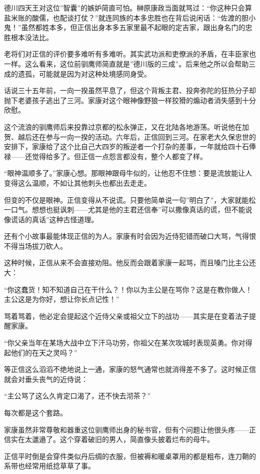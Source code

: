 \documentclass[
]{article}
\begin{document}
德川四天王对这位''智囊''的嫉妒简直可怕。榊原康政当面就骂过：``你这种只会算盐米账的酸儒，也配谈打仗？''就连同族的本多忠胜也在背后说闲话：``佐渡的胆小鬼！''虽然都姓本多，但正信出身本多五家里最不起眼的定吉家，跟出身名门的忠胜根本没法比。

老将们对正信的评价要多难听有多难听。其实武功派和吏僚派的矛盾，在丰臣家也一样。这么看来，这位前驯鹰师简直就是''德川版的三成''。后来他之所以会帮助三成的遗孤，可能就是因为对这种处境感同身受。

话说三十五年前，一向一揆虽然平息了，但这个背叛主君、投奔弥陀的狂热分子却抛下老婆孩子逃出了三河。家康对这个眼神像野狼一样狡猾的煽动者消失感到十分欣慰。

这个流浪的驯鹰师后来投靠过京都的松永弹正，又在北陆各地游荡。听说他在加贺、越后还在参与一向一揆的活动。六年后，正信回到三河。在家老大久保忠世的安排下，家康给了这个比自己大四岁的叛逆者一个打杂的差事，一年就给四十石俸禄------还觉得给多了。但正信一点怨言都没有，整个人都变了样。

``眼神温顺多了。''家康心想。那眼神跟母牛似的，让他忍不住想：要是流放能让人变得这么温顺，不如让其他刺头也都出去走走。

但变的不仅是眼神。正信变得从不说谎。只要他简单说一句''明白了''，大家就能松一口气。想想也挺讽刺------尤其是他的主君还信奉''可以撒像真话的谎，但不能说像谎话的真话''这种古怪道理。

还有个小故事最能体现正信的为人。家康有时会因为近侍犯错而破口大骂，气得恨不得当场拔刀砍人。

这种时候，正信从来不会直接劝阻。他反而会跟着家康一起骂，而且嗓门比主公还大：

``你这蠢货！知不知道自己在干什么？！你以为主公是在骂你？这是在教你做人！主公这是为你好，想让你长点记性！''

骂着骂着，他必定会提起这个近侍父亲或祖父立下的战功------其实是在变着法子提醒家康。

``你父亲当年在某场大战中立下汗马功劳，你祖父在某次攻城时表现英勇。你对得起他们的在天之灵吗？''

等正信这么滔滔不绝地说上一通，家康的怒气通常也就消得差不多了。这时候正信就会对垂头丧气的近侍说：

``主公骂了这么久肯定口渴了，还不快去沏茶？''

每次都是这个套路。

家康虽然非常尊敬和器重这位驯鹰师出身的秘书官，但有个问题让他很头疼------正信实在太邋遢了。这个穿着破旧的男人，简直像头披着烂布的母牛。

正信平时倒是会穿件类似丹后绸的衣服，但被褥和暖桌罩用的都是粗布，连刀鞘的系带也经常用纸捻草草了事。
\end{document}
